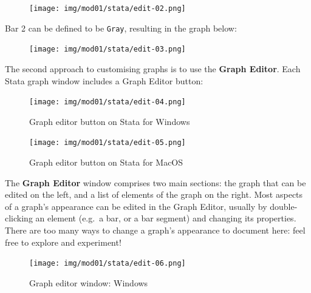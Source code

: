 \documentclass[
  a4paper,
]{memoir}
\begin{document}
\begin{figure}[H]

{\centering \texttt{[image: img/mod01/stata/edit-02.png]}

}

\end{figure}

Bar 2 can be defined to be \texttt{Gray}, resulting in the graph below:

\begin{figure}[H]

{\centering \texttt{[image: img/mod01/stata/edit-03.png]}

}

\end{figure}

The second approach to customising graphs is to use the \textbf{Graph
Editor}. Each Stata graph window includes a Graph Editor button:

\begin{figure}[H]

{\centering \texttt{[image: img/mod01/stata/edit-04.png]}

}

\caption{Graph editor button on Stata for Windows}

\end{figure}

\begin{figure}[H]

{\centering \texttt{[image: img/mod01/stata/edit-05.png]}

}

\caption{Graph editor button on Stata for MacOS}

\end{figure}

The \textbf{Graph Editor} window comprises two main sections: the graph
that can be edited on the left, and a list of elements of the graph on
the right. Most aspects of a graph's appearance can be edited in the
Graph Editor, usually by double-clicking an element (e.g.~a bar, or a
bar segment) and changing its properties. There are too many ways to
change a graph's appearance to document here: feel free to explore and
experiment!

\begin{figure}[H]

{\centering \texttt{[image: img/mod01/stata/edit-06.png]}

}

\caption{Graph editor window: Windows}

\end{figure}
\end{document}
